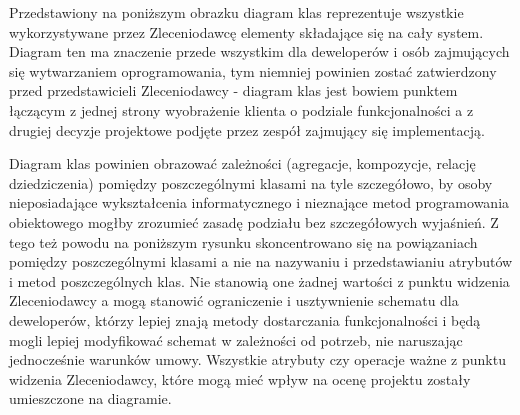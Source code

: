 
Przedstawiony na poniższym obrazku diagram klas reprezentuje wszystkie
wykorzystywane przez Zleceniodawcę elementy składające się na cały system.
Diagram ten ma znaczenie przede wszystkim dla deweloperów i osób zajmujących się
wytwarzaniem oprogramowania, tym niemniej powinien zostać zatwierdzony przed
przedstawicieli Zleceniodawcy - diagram klas jest bowiem punktem łączącym z
jednej strony wyobrażenie klienta o podziale funkcjonalności a z drugiej decyzje
projektowe podjęte przez zespół zajmujący się implementacją.

Diagram klas powinien obrazować zależności (agregacje, kompozycje, relację
dziedziczenia) pomiędzy poszczególnymi klasami na tyle szczegółowo, by osoby 
nieposiadające wykształcenia informatycznego i nieznające metod programowania
obiektowego mogłby zrozumieć zasadę podziału bez szczegółowych wyjaśnień. Z
tego też powodu na poniższym rysunku skoncentrowano się na powiązaniach pomiędzy
poszczególnymi klasami a nie na nazywaniu i przedstawianiu atrybutów i metod
poszczególnych klas. Nie stanowią one żadnej wartości z punktu widzenia
Zleceniodawcy a mogą stanowić ograniczenie i usztywnienie schematu dla
deweloperów, którzy lepiej znają metody dostarczania funkcjonalności i będą
mogli lepiej modyfikować schemat w zależności od potrzeb, nie naruszając
jednocześnie warunków umowy. Wszystkie atrybuty czy operacje ważne z punktu
widzenia Zleceniodawcy, które mogą mieć wpływ na ocenę projektu zostały
umieszczone na diagramie.

